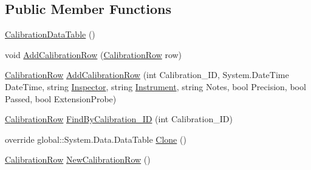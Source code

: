\subsection*{Public Member Functions}
\begin{DoxyCompactItemize}
\item 
\hyperlink{class_env_int_1_1_win32_1_1_field_tech_1_1_manager_1_1_data_sets_1_1_guide_ware_mobile_data_set_1_1_calibration_data_table_a0f3eb9fb5676459ed7a79b2bece85fa3}{Calibration\+Data\+Table} ()
\item 
void \hyperlink{class_env_int_1_1_win32_1_1_field_tech_1_1_manager_1_1_data_sets_1_1_guide_ware_mobile_data_set_1_1_calibration_data_table_a7e6af26f98d927cda12cad34aab3b701}{Add\+Calibration\+Row} (\hyperlink{class_env_int_1_1_win32_1_1_field_tech_1_1_manager_1_1_data_sets_1_1_guide_ware_mobile_data_set_1_1_calibration_row}{Calibration\+Row} row)
\item 
\hyperlink{class_env_int_1_1_win32_1_1_field_tech_1_1_manager_1_1_data_sets_1_1_guide_ware_mobile_data_set_1_1_calibration_row}{Calibration\+Row} \hyperlink{class_env_int_1_1_win32_1_1_field_tech_1_1_manager_1_1_data_sets_1_1_guide_ware_mobile_data_set_1_1_calibration_data_table_a0e6c3c7eaa08cb661342badd94694087}{Add\+Calibration\+Row} (int Calibration\+\_\+\+I\+D, System.\+Date\+Time Date\+Time, string \hyperlink{class_env_int_1_1_win32_1_1_field_tech_1_1_manager_1_1_data_sets_1_1_guide_ware_mobile_data_set_aea6ce166ee8ad97370fdd789f985f3a2}{Inspector}, string \hyperlink{class_env_int_1_1_win32_1_1_field_tech_1_1_manager_1_1_data_sets_1_1_guide_ware_mobile_data_set_a56f97bc6da74f712d8ae3a7ad4d2280f}{Instrument}, string Notes, bool Precision, bool Passed, bool Extension\+Probe)
\item 
\hyperlink{class_env_int_1_1_win32_1_1_field_tech_1_1_manager_1_1_data_sets_1_1_guide_ware_mobile_data_set_1_1_calibration_row}{Calibration\+Row} \hyperlink{class_env_int_1_1_win32_1_1_field_tech_1_1_manager_1_1_data_sets_1_1_guide_ware_mobile_data_set_1_1_calibration_data_table_a82f1686a81eb0a384042a7c19aa3abf5}{Find\+By\+Calibration\+\_\+\+I\+D} (int Calibration\+\_\+\+I\+D)
\item 
override global\+::\+System.\+Data.\+Data\+Table \hyperlink{class_env_int_1_1_win32_1_1_field_tech_1_1_manager_1_1_data_sets_1_1_guide_ware_mobile_data_set_1_1_calibration_data_table_a3c48c01cbab2bcf381666be43d9d5c7c}{Clone} ()
\item 
\hyperlink{class_env_int_1_1_win32_1_1_field_tech_1_1_manager_1_1_data_sets_1_1_guide_ware_mobile_data_set_1_1_calibration_row}{Calibration\+Row} \hyperlink{class_env_int_1_1_win32_1_1_field_tech_1_1_manager_1_1_data_sets_1_1_guide_ware_mobile_data_set_1_1_calibration_data_table_a6da89fdd4bcb4da02468a5d52d78b9be}{New\+Calibration\+Row} ()

\end{DoxyCompactItemize}
